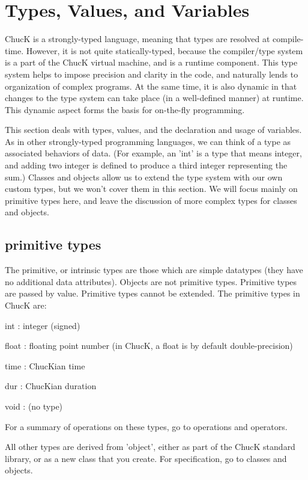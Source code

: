 \chapter{Types, Values, and Variables}

ChucK is a strongly-typed language, meaning that types are resolved at compile-time. However, it is not quite statically-typed, because the compiler/type system is a part of the ChucK virtual machine, and is a runtime component. This type system helps to impose precision and clarity in the code, and naturally lends to organization of complex programs. At the same time, it is also dynamic in that changes to the type system can take place (in a well-defined manner) at runtime. This dynamic aspect forms the basis for on-the-fly programming.

This section deals with types, values, and the declaration and usage of variables. As in other strongly-typed programming languages, we can think of a type as associated behaviors of data. (For example, an 'int' is a type that means integer, and adding two integer is defined to produce a third integer representing the sum.) Classes and objects allow us to extend the type system with our own custom types, but we won't cover them in this section. We will focus mainly on primitive types here, and leave the discussion of more complex types for classes and objects.
 
\section{primitive types}

The primitive, or intrinsic types are those which are simple datatypes (they have no additional data attributes). Objects are not primitive types. Primitive types are passed by value. Primitive types cannot be extended. The primitive types in ChucK are:
\begin{chuckitemize}
\item  int : integer (signed)
\item  float : floating point number (in ChucK, a float is by default double-precision)
\item  time : ChucKian time
\item  dur : ChucKian duration
\item  void : (no type)
\end{chuckitemize}
For a summary of operations on these types, go to operations and operators.

All other types are derived from 'object', either as part of the ChucK standard library, or as a new class that you create. For specification, go to classes and objects.
 

